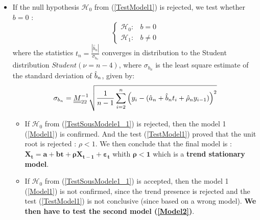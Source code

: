 \begin{itemize}
\item If the null hypothesis  $\mathcal{H}_0$  from (\ref{TestModel1}) is rejected, we test whether $b=0$  :
  \begin{equation}\label{TestSousModele1_1}
    \left\{
    \begin{array}{lr}
      \mathcal{H}_0 :  & b = 0 \\
      \mathcal{H}_1 : & b \neq 0
    \end{array}
    \right.
  \end{equation}
  where the statistics $t_n = \frac{|\hat{b}_n|}{\sigma_{b_n}}$ converges in distribution to the Student distribution $Student(\nu=n-4)$, where $\sigma_{b_n}$ is the least square estimate of the standard deviation of $\Hat{b}_n$, given by:
  \begin{equation}
    \sigma_{b_n}={\underline{\underline{M}}}^{-1}_{22}\sqrt{\frac{1}{n-1}\sum_{i=2}^n\left(y_{i}-(\hat{a}_n+\hat{b}_nt_i+\hat{\rho}_ny_{i-1})\right)^2}
  \end{equation}

  \begin{itemize}
  \item If $\mathcal{H}_0$  from (\ref{TestSousModele1_1}) is rejected, then the model 1 (\ref{Model1}) is confirmed.  And the  test (\ref{TestModel1}) proved that the unit root is rejected : $ \rho < 1$. We then conclude that the final model is : $\boldsymbol{X_t = a + bt +  \rho X_{t-1} + \varepsilon_{t}}$ whith $\boldsymbol{\rho < 1}$ which is a {\bf trend stationary model}.
  \item  If $\mathcal{H}_0$  from (\ref{TestSousModele1_1}) is accepted, then the model 1 (\ref{Model1}) is not confirmed, since the trend presence is rejected and the test (\ref{TestModel1}) is not conclusive (since based on a wrong model). {\bf We then have to test the second model (\ref{Model2})}.
  \end{itemize}



\end{itemize}

